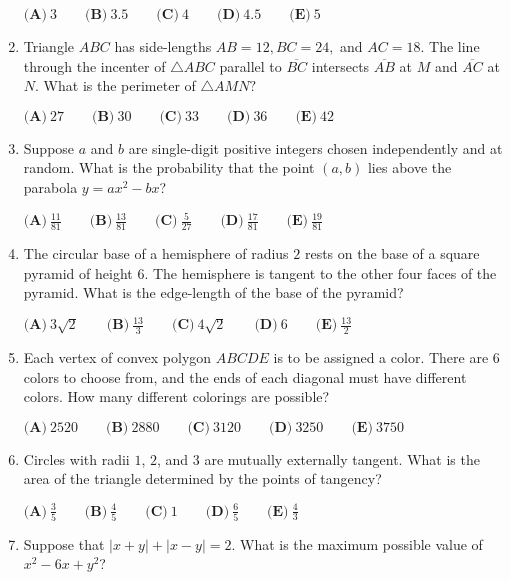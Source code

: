 \documentclass{article}
\begin{document}
\begin{enumerate}[label=\arabic*., itemsep=0.5em]
$
\textbf{(A)}\ 3 \qquad
\textbf{(B)}\ 3.5 \qquad
\textbf{(C)}\  4 \qquad
\textbf{(D)}\ 4.5 \qquad
\textbf{(E)}\ 5 $\par \vspace{0.5em}\item Triangle $ABC$ has side-lengths $AB = 12, BC = 24,$ and $AC = 18.$ The line through the incenter of $\triangle ABC$ parallel to $\overline{BC}$ intersects $\overline{AB}$ at $M$ and $\overline{AC}$ at $N.$ What is the perimeter of $\triangle AMN?$

$
\textbf{(A)}\ 27 \qquad
\textbf{(B)}\ 30 \qquad
\textbf{(C)}\  33 \qquad
\textbf{(D)}\ 36 \qquad
\textbf{(E)}\ 42 $\par \vspace{0.5em}\item Suppose $a$ and $b$ are single-digit positive integers chosen independently and at random. What is the probability that the point $(a,b)$ lies above the parabola $y=ax^2-bx$?

$
\textbf{(A)}\ \frac{11}{81} \qquad
\textbf{(B)}\ \frac{13}{81} \qquad
\textbf{(C)}\ \frac{5}{27} \qquad
\textbf{(D)}\ \frac{17}{81} \qquad
\textbf{(E)}\ \frac{19}{81} $\par \vspace{0.5em}\item The circular base of a hemisphere of radius $2$ rests on the base of a square pyramid of height $6$. The hemisphere is tangent to the other four faces of the pyramid. What is the edge-length of the base of the pyramid?

$
\textbf{(A)}\ 3\sqrt{2} \qquad
\textbf{(B)}\ \frac{13}{3} \qquad
\textbf{(C)}\ 4\sqrt{2} \qquad
\textbf{(D)}\ 6 \qquad
\textbf{(E)}\ \frac{13}{2} $\par \vspace{0.5em}\item Each vertex of convex polygon $ABCDE$ is to be assigned a color. There are $6$ colors to choose from, and the ends of each diagonal must have different colors. How many different colorings are possible?

$
\textbf{(A)}\ 2520 \qquad
\textbf{(B)}\ 2880 \qquad
\textbf{(C)}\ 3120 \qquad
\textbf{(D)}\ 3250 \qquad
\textbf{(E)}\ 3750 $\par \vspace{0.5em}\item Circles with radii $1$, $2$, and $3$ are mutually externally tangent. What is the area of the triangle determined by the points of tangency?

$
\textbf{(A)}\ \frac{3}{5} \qquad
\textbf{(B)}\ \frac{4}{5} \qquad
\textbf{(C)}\ 1 \qquad
\textbf{(D)}\ \frac{6}{5} \qquad
\textbf{(E)}\ \frac{4}{3} $\par \vspace{0.5em}\item Suppose that $\left|x+y\right|+\left|x-y\right|=2$. What is the maximum possible value of $x^2-6x+y^2$?


\end{enumerate}
\end{document}
